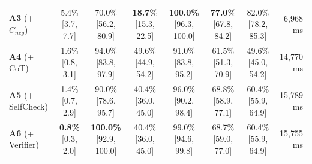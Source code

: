 \begin{table}[t]
\begin{tabular}{lccccccr}
\textbf{A3} (+ $C_{neg}$) & 5.4\% [3.7, 7.7] & 70.0\% [56.2, 80.9] & \textbf{18.7\%} [15.3, 22.5] & \textbf{100.0\%} [96.3, 100.0] & \textbf{77.0\%} [67.8, 84.2] & 82.0\% [78.2, 85.3] & 6,968 ms \\
\textbf{A4} (+ CoT) & 1.6\% [0.8, 3.1] & 94.0\% [83.8, 97.9] & 49.6\% [44.9, 54.2] & 91.0\% [83.8, 95.2] & 61.5\% [51.3, 70.9] & 49.6\% [45.0, 54.2] & 14,770 ms \\
\textbf{A5} (+ SelfCheck) & 1.4\% [0.7, 2.9] & 90.0\% [78.6, 95.7] & 40.4\% [36.0, 45.0] & 96.0\% [90.2, 98.4] & 68.8\% [58.9, 77.1] & 60.4\% [55.9, 64.9] & 15,789 ms \\
\textbf{A6} (+ Verifier) & \textbf{0.8\%} [0.3, 2.0] & \textbf{100.0\%} [92.9, 100.0] & 40.4\% [36.0, 45.0] & 99.0\% [94.6, 99.8] & 68.7\% [59.0, 77.0] & 60.4\% [55.9, 64.9] & 15,755 ms \\
\bottomrule
\end{tabular}
\end{table}
